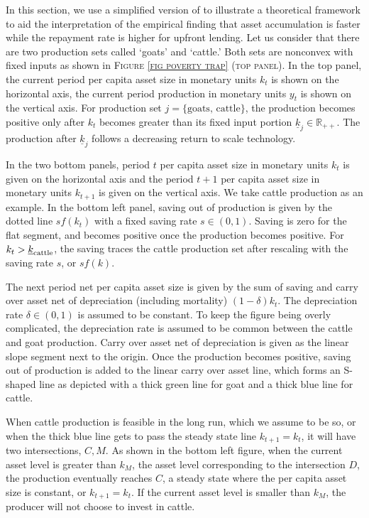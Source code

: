 \vspace{2ex}
	In this section, we use a simplified version of \citet{GalorZeira1993} to illustrate a theoretical framework to aid the interpretation of the empirical finding that asset accumulation is faster while the repayment rate is higher for upfront lending. Let us consider that there are two production sets called `goats' and `cattle.' Both sets are nonconvex with fixed inputs as shown in \textsc{\small Figure \ref{fig poverty trap} (top panel)}. 
	In the top panel, the current period per capita asset size in monetary units $k_{t}$ is shown on the horizontal axis, the current period production in monetary units $y_{t}$ is shown on the vertical axis. For production set $j=\{\mbox{goats, cattle}\}$, the production becomes positive only after $k_{t}$ becomes greater than its fixed input portion $\underline{k}_{j}\in\mathbb R_{++}$.  The production after $\underline{k}_{j}$ follows a decreasing return to scale technology. 
	
	In the two bottom panels, period $t$ per capita asset size in monetary units $k_{t}$ is given on the horizontal axis and the period $t+1$ per capita asset size in monetary units $k_{t+1}$ is given on the vertical axis. We take cattle production as an example. In the bottom left panel, saving out of production is given by the dotted line $sf(k_{t})$ with a fixed saving rate $s\in(0, 1)$. Saving is zero for the flat segment, and becomes positive once the production becomes positive. For $k_{t}>\underline{k}_{\mbox{\scriptsize cattle}}$, the saving traces the cattle production set after rescaling with the saving rate $s$, or $sf(k)$. 
	
	The next period net per capita asset size is given by the sum of saving and carry over asset net of depreciation (including mortality) $(1-\delta)k_{t}$.  The depreciation rate $\delta\in(0, 1)$ is assumed to be constant. To keep the figure being overly complicated, the depreciation rate is assumed to be common between the cattle and goat production. Carry over asset net of depreciation is given as the linear slope segment next to the origin. Once the production becomes positive, saving out of production is added to the linear carry over asset line, which forms an S-shaped line as depicted with a thick green line for goat and a thick blue line for cattle. 
	
	When cattle production is feasible in the long run, which we assume to be so, or when the thick blue line gets to pass the steady state line $k_{t+1}=k_{t}$, it will have two intersections, $C, M$. As shown in the bottom left figure, when the current asset level is greater than $k_{M}$, the asset level corresponding to the intersection $D$, the production eventually reaches $C$, a steady state where the per capita asset size is constant, or $k_{t+1}=k_{t}$. If the current asset level is smaller than $k_{M}$, the producer will not choose to invest in cattle.
	
